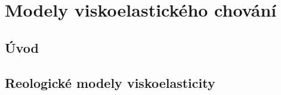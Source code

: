 \chapter{Modely viskoelastického chování}
\section{Úvod}



\section{Reologické modely viskoelasticity}


